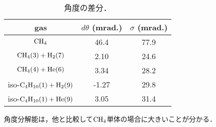 \documentclass[../master]{subfiles}
\begin{document}
\begin{table}
  \centering
  \caption{角度の差分．}
  \label{tab::theta_resolution}
  \begin{tabular}{ccc}
    \toprule
    gas & $d\theta$ (mrad.) & $\sigma$ (mrad.) \\
    \midrule
    $\rm CH_{4}$ & 46.4 & 77.9 \\
    $\rm CH_{4} (3) + H_{2} (7)$ & 2.10 & 24.6 \\
    $\rm CH_{4} (4) + He (6)$ & 3.34 & 28.2 \\
    iso-$\rm C_{4}H_{10} (1) + H_{2} (9)$ & -1.27 & 29.8 \\
    iso-$\rm C_{4}H_{10} (1) + He (9) $ & 3.05 & 31.4 \\
    \midrule
  \end{tabular}
\end{table}
角度分解能は，他と比較して$\rm CH_{4}$単体の場合に大きいことが分かる．
\end{document}
